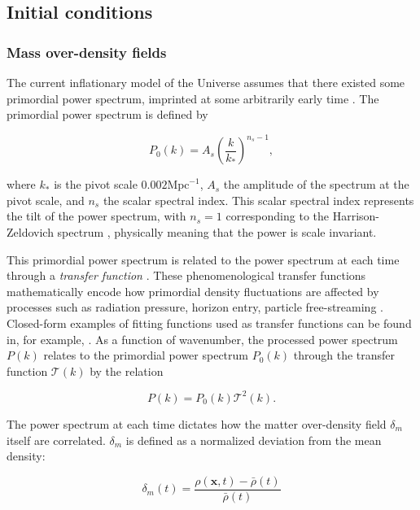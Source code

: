 \documentclass[floats,floatfix,showpacs,amssymb,prd,superscriptaddress,nofootinbib]{revtex4-2} %
\begin{document}
\subsection{Initial conditions}
\subsubsection{Mass over-density fields}
The current inflationary model of the Universe assumes that there existed some primordial power spectrum, imprinted at some arbitrarily early time \citep{Coles_2001}. The primordial power spectrum is defined by 

\begin{equation}
    P_0 (k) = A_s \left( \frac{k}{k_*} \right)^{n_s - 1},
    \label{eq:primordial_power_spectrum}
\end{equation}

\noindent where $k_*$ is the pivot scale $0.002 \text{Mpc}^{-1}$,
$A_s$ the amplitude of the spectrum at the pivot scale, and $n_s$ the scalar spectral index. This scalar spectral index represents the tilt of the power spectrum, with $n_s = 1$ corresponding to the Harrison-Zeldovich spectrum \citep{Harrison_1970, Zeldovich_1972}, physically meaning that the power is scale invariant.

This primordial power spectrum is related to the power spectrum at each time through a \textit{transfer function} \citep{Bardeen_1986}. These phenomenological transfer functions mathematically encode how primordial density fluctuations are affected by processes such as radiation pressure, horizon entry, particle free-streaming \citep{Coles_2001}. Closed-form examples of fitting functions used as transfer functions can be found in, for example, \citet{Bardeen_1986, Eisenstein_Hu_1998}. As a function of wavenumber, the processed power spectrum $P(k)$ relates to the primordial power spectrum $P_0 (k)$ through the transfer function $\mathcal{T}(k)$ by the relation

\begin{equation}
    P(k) = P_0 (k) \mathcal{T}^2 (k).
    \label{eq:processed_power_spectrum}
\end{equation}

The power spectrum at each time dictates how the matter over-density field $\delta_m$ itself are correlated. $\delta_m$ is defined as a normalized deviation from the mean density:

\begin{equation}
    \delta_m(t) = \frac{\rho(\textbf{x}, t) - \bar{\rho}(t)}{\bar{\rho}(t)}
    \label{eq:delta_m_definition}
\end{equation}
\end{document}
